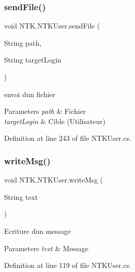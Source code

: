 \subsubsection{\texorpdfstring{sendFile()}{sendFile()}}
{\footnotesize\ttfamily void N\+T\+K.\+N\+T\+K\+User.\+send\+File (\begin{DoxyParamCaption}\item[{String}]{path,  }\item[{String}]{target\+Login }\end{DoxyParamCaption})}



envoi d\textquotesingle{}un fichier 


\begin{DoxyParams}{Parameters}
{\em path} & Fichier\\
\hline
{\em target\+Login} & Cible (Utilisateur)\\
\hline
\end{DoxyParams}


Definition at line 243 of file N\+T\+K\+User.\+cs.

\mbox{\label{class_n_t_k_1_1_n_t_k_user_a55435ca4759c1daa467be2479c2b598e}} 
\subsubsection{\texorpdfstring{writeMsg()}{writeMsg()}}
{\footnotesize\ttfamily void N\+T\+K.\+N\+T\+K\+User.\+write\+Msg (\begin{DoxyParamCaption}\item[{String}]{text }\end{DoxyParamCaption})}



Ecriture d\textquotesingle{}un message 


\begin{DoxyParams}{Parameters}
{\em text} & Message\\
\hline
\end{DoxyParams}


Definition at line 119 of file N\+T\+K\+User.\+cs.

\mbox{\label{class_n_t_k_1_1_n_t_k_user_a729769d1f8aefcbec4350a8030943d96}} 

